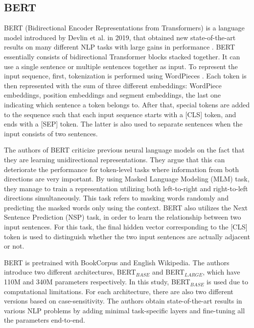 \documentclass{report}
\theoremstyle{definition}
\theoremstyle{remark}
\begin{document}
\subsection{BERT}
BERT (Bidirectional Encoder Representations from
Transformers) is a language model introduced by Devlin et al. in 2019, that obtained new state-of-the-art results on many different NLP tasks with large gains in performance \cite{BERT}. BERT essentially consists of bidirectional Transformer \cite{transformer} blocks stacked together. It can use a single sentence or multiple sentences together as input. To represent the input sequence, first, tokenization is performed using WordPieces \cite{wordpiece}. Each token is then represented with the sum of three different embeddings: WordPiece embeddings, position embeddings and segment embeddings, the last one indicating which sentence a token belongs to. After that, special tokens are added to the sequence such that each input sequence starts with a [CLS] token, and ends with a [SEP] token. The latter is also used to separate sentences when the input consists of two sentences. 

The authors of BERT criticize previous neural language models on the fact that they are learning unidirectional representations. They argue that this can deteriorate the performance for token-level tasks where information from both directions are very important. By using Masked Language Modeling (MLM) task, they manage to train a representation utilizing both left-to-right and right-to-left directions simultaneously. This task refers to masking words randomly and predicting the masked words only using the context. BERT also utilizes the Next Sentence Prediction (NSP) task, in order to learn the relationship between two input sentences. For this task, the final hidden vector corresponding to the [CLS] token is used to distinguish whether the two input sentences are actually adjacent or not.

BERT is pretrained with BookCorpus \cite{bookscorpus} and English Wikipedia. The authors introduce two different architectures, BERT$_{BASE}$ and BERT$_{LARGE}$, which have 110M and 340M parameters respectively. In this study, BERT$_{BASE}$ is used due to computational limitations. For each architecture, there are also two different versions based on case-sensitivity. The authors obtain state-of-the-art results in various NLP problems by adding minimal task-specific layers and fine-tuning all the parameters end-to-end.
\end{document}
